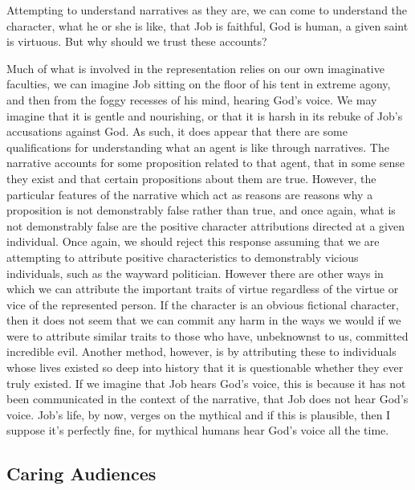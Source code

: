 \documentclass[
  letterpaper,
  DIV=11,
  numbers=noendperiod]{scrartcl}
\theoremstyle{remark}
\begin{document}
Attempting to understand narratives as they are, we can come to
understand the character, what he or she is like, that Job is faithful,
God is human, a given saint is virtuous. But why should we trust these
accounts?

Much of what is involved in the representation relies on our own
imaginative faculties, we can imagine Job sitting on the floor of his
tent in extreme agony, and then from the foggy recesses of his mind,
hearing God's voice. We may imagine that it is gentle and nourishing, or
that it is harsh in its rebuke of Job's accusations against God. As
such, it does appear that there are some qualifications for
understanding what an agent is like through narratives. The narrative
accounts for some proposition related to that agent, that in some sense
they exist and that certain propositions about them are true. However,
the particular features of the narrative which act as reasons are
reasons why a proposition is not demonstrably false rather than true,
and once again, what is not demonstrably false are the positive
character attributions directed at a given individual. Once again, we
should reject this response assuming that we are attempting to attribute
positive characteristics to demonstrably vicious individuals, such as
the wayward politician. However there are other ways in which we can
attribute the important traits of virtue regardless of the virtue or
vice of the represented person. If the character is an obvious fictional
character, then it does not seem that we can commit any harm in the ways
we would if we were to attribute similar traits to those who have,
unbeknownst to us, committed incredible evil. Another method, however,
is by attributing these to individuals whose lives existed so deep into
history that it is questionable whether they ever truly existed. If we
imagine that Job hears God's voice, this is because it has not been
communicated in the context of the narrative, that Job does not hear
God's voice. Job's life, by now, verges on the mythical and if this is
plausible, then I suppose it's perfectly fine, for mythical humans hear
God's voice all the time.

\subsection{Caring Audiences}\label{caring-audiences}
\end{document}

